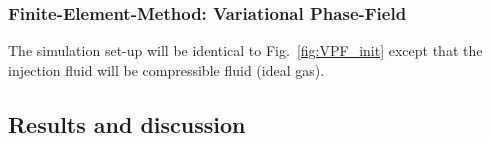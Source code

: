 \subsubsection*{Finite-Element-Method: Variational Phase-Field}

The simulation set-up will be identical to Fig.~\ref{fig:VPF_init} except that the injection fluid will be compressible fluid (ideal gas). 

\subsection{Results and discussion}
